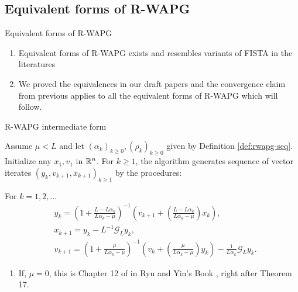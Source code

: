 \documentclass[11pt]{beamer}
\theoremstyle{definition}
\begin{document}
    \subsection{Equivalent forms of R-WAPG}
        \begin{frame}{Equivalent forms of R-WAPG}
            \begin{enumerate}
                \item Equivalent forms of R-WAPG exists and resembles variants of FISTA in the literatures
                \item We proved the equivalences in our draft papers and the convergence claim from previous applies to all the equivalent forms of R-WAPG which will follow. 
            \end{enumerate}    
        \end{frame}
        \begin{frame}{R-WAPG intermediate form}
            \begin{definition}\label{def:r-wapg-intermediate}
                Assume $\mu < L$ and let $(\alpha_k)_{k \ge 0}, (\rho_k)_{k \ge 0}$ given by Definition \ref{def:rwapg-seq}. 
                Initialize any $x_1, v_1$ in $\mathbb R^n$. 
                For $k \ge 1$, the algorithm generates sequence of vector iterates $(y_{k}, v_{k + 1}, x_{k + 1})_{k \ge 1}$ by the procedures: 
                {\small
                \begin{tcolorbox}
                    For $k = 1, 2, \ldots$
                    \begin{align*} 
                        & y_{k} = 
                        \left(
                            1 + \frac{L - L\alpha_{k}}{L\alpha_{k} - \mu}
                        \right)^{-1}
                        \left(
                            v_{k + 1} + 
                            \left(\frac{L - L\alpha_{k}}{L\alpha_{k} - \mu} \right) x_{k}
                        \right), 
                        \\
                        & x_{k + 1} = 
                        y_k - L^{-1} \mathcal G_L y_k, 
                        \\
                        & v_{k + 1} = 
                        \left(
                            1 + \frac{\mu}{L \alpha_k - \mu}
                        \right)^{-1}
                        \left(
                            v_k + 
                            \left(\frac{\mu}{L \alpha_k - \mu}\right) y_k
                        \right) - \frac{1}{L\alpha_{k}}\mathcal G_L y_k. 
                    \end{align*}
                \end{tcolorbox}
                }
            \end{definition}
            \pause
            \begin{enumerate}
                \item If, $\mu = 0$, this is Chapter 12 of in Ryu and Yin's Book \cite{ryu_large-scale_2022}, right after Theorem 17.
            \end{enumerate}
        \end{frame}
\end{document}
